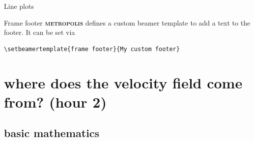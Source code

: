 \documentclass[10pt,dvipsnames]{beamer}
\newcommand{\themename}{\textbf{\textsc{metropolis}}\xspace}
\begin{document}
\begin{frame}{Line plots}
  \begin{figure}
  \end{figure}
\end{frame}

{%
\begin{frame}[fragile]{Frame footer}
    \themename defines a custom beamer template to add a text to the footer. It can be set via
    \begin{verbatim}\setbeamertemplate{frame footer}{My custom footer}\end{verbatim}
\end{frame}
}


\section[where does the velocity field come from?]{\textbf{where does the velocity field come from?} (hour 2)}

\subsection{basic mathematics}
\end{document}
